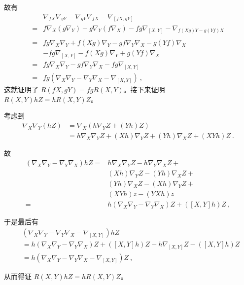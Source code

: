 故有
\begin{equation}
\begin{aligned}
&\nabla_{fX}\nabla_{gY}-\nabla_{gY}\nabla_{fX}-\nabla_{[fX, gY]}\\={}&f\nabla_X(g\nabla_Y)-g\nabla_Y(f\nabla_X)-fg\nabla_{[X, Y]}-\nabla_{f(Xg)Y-g(Yf)X}\\
\\={}&fg\nabla_X\nabla_Y+f(Xg)\nabla_Y-gf\nabla_Y\nabla_X-g(Yf)\nabla_X\\&-fg\nabla_{[X, Y]}-f(Xg)\nabla_Y+g(Yf)\nabla_X\\
={}&fg\nabla_X\nabla_Y-gf\nabla_Y\nabla_X-fg\nabla_{[X, Y]}\\
={}&fg(\nabla_X\nabla_Y-\nabla_Y\nabla_X-\nabla_{[X, Y]})~,
\end{aligned}
\end{equation}
这就证明了 $R(fX, gY)=fgR(X, Y)$。接下来证明 $R(X, Y)hZ=hR(X, Y)Z$。

考虑到
\begin{equation}
\begin{aligned}
\nabla_X\nabla_Y(hZ)&=\nabla_X(h\nabla_YZ+(Yh)Z)\\
&=h\nabla_X\nabla_YZ+(Xh)\nabla_YZ+(Yh)\nabla_XZ+(XYh)Z~.
\end{aligned}
\end{equation}

故
\begin{equation}
\begin{aligned}
(\nabla_X\nabla_Y-\nabla_Y\nabla_X)hZ={}& h\nabla_X\nabla_YZ-h\nabla_Y\nabla_XZ+\\&(Xh)\nabla_YZ-(Yh)\nabla_XZ+\\&(Yh)\nabla_XZ-(Xh)\nabla_YZ+\\&(XYh)z-(YXh)z\\
={}& h(\nabla_X\nabla_Y-\nabla_Y\nabla_X)Z+([X, Y]h)Z~,
\end{aligned}
\end{equation}

于是最后有
\begin{equation}
\begin{aligned}
&(\nabla_X\nabla_Y-\nabla_Y\nabla_X-\nabla_{[X, Y]})hZ\\
&=h(\nabla_X\nabla_Y-\nabla_Y\nabla_X)Z+([X, Y]h)Z-h\nabla_{[X, Y]}Z-([X, Y]h)Z\\
&=h(\nabla_X\nabla_Y-\nabla_Y\nabla_X-\nabla_{[X, Y]})Z~,
\end{aligned}
\end{equation}

从而得证 $R(X, Y)hZ=hR(X, Y)Z$。


